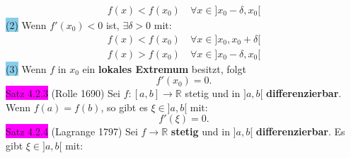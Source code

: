 \documentclass[landscape, 10pt]{article}
\newcommand{\R}{\mathbb{R}}
\begin{document}
\begin{multicols}{3}
\begin{align*}
                                   f(x)<f(x_0)\quad
                                   \forall x
                                   \in]x_0-\delta,x_0[
                            \end{align*}
                     \colorbox{SkyBlue}{(2)} 
                            Wenn 
                            \textcolor{NavyBlue}{$f'(x_0)<0$} 
                            ist, 
                            \textcolor{NavyBlue}{
                            $\exists\delta>0$} mit: 
                            \begin{align*}
                                   f(x)<f(x_0)\quad
                                   \forall x
                                   \in]x_0,x_0+\delta[\\
                                   f(x)>f(x_0)\quad
                                   \forall x
                                   \in]x_0-\delta,x_0[
                            \end{align*}
                     \colorbox{SkyBlue}{(3)} 
                            Wenn \textcolor{NavyBlue}{$f$} in 
                            \textcolor{NavyBlue}{$x_0$} ein 
                            \textbf{lokales Extremum} 
                            besitzt, folgt 
                            \begin{equation*}
                                   f'(x_0)=0.
                            \end{equation*}
              \colorbox{magenta}{Satz 4.2.3} 
              (Rolle 1690) 
                     Sei \textcolor{NavyBlue}{
                     $f:[a,b]\longrightarrow\R$}
                     stetig und in \textcolor{NavyBlue}{$]a,b[$} 
                     \textbf{differenzierbar}. 
                     Wenn \textcolor{NavyBlue}{$f(a)=f(b)$}, 
                     so gibt es 
                     \textcolor{NavyBlue}{$\xi\in]a,b[$} mit: 
                     \begin{equation*}
                            f'(\xi)=0.
                     \end{equation*}
              \colorbox{magenta}{Satz 4.2.4}
              (Lagrange 1797) 
                     Sei \textcolor{NavyBlue}{
                     $f\longrightarrow\R$}
                     \textbf{stetig} und in 
                     \textcolor{NavyBlue}{$]a,b[$} 
                     \textbf{differenzierbar}. 
                     Es gibt \textcolor{NavyBlue}{
                     $\xi\in]a,b[$} mit: 
                     \begin{equation*}

\end{equation*}
\end{multicols}
\end{document}
